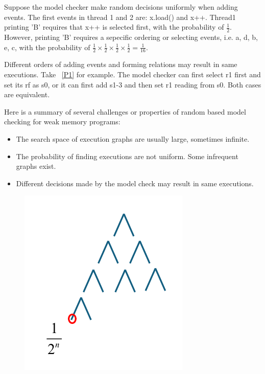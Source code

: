 Suppose the model checker make random decisions uniformly when adding events. The first events in thread 1 and 2 are: x.load() and x++. Thread1 printing 'B' requires that x++ is selected first, with the probability of $\frac{1}{2}$. However, printing 'B' requires a sepecific ordering or selecting events, i.e. {a, d, b, e, c}, with the probability of $\frac{1}{2} \times \frac{1}{2}  \times \frac{1}{2}  \times \frac{1}{2} =  \frac{1}{16}$.


Different orders of adding events and forming relations may result in same executions. Take ~\ref{P1} for example. The model checker can first select r1 first and set its rf as s0, or it can first add s1-3 and then set r1 reading from s0. Both cases are equivalent.

Here is a summary of several challenges or properties of random based model checking for weak memory programs:
\begin{itemize}
    \item The search space of execution graphs are usually large, sometimes infinite.
    \item The probability of finding executions are not uniform. Some infrequent graphs exist.
    \item Different decisions made by the model check may result in same executions.
\end{itemize}


\begin{figure}[htbp] %
    \centering
    \includegraphics[scale=0.5]{figure/tree.pdf} %
    \label{fig:example} %
\end{figure}









